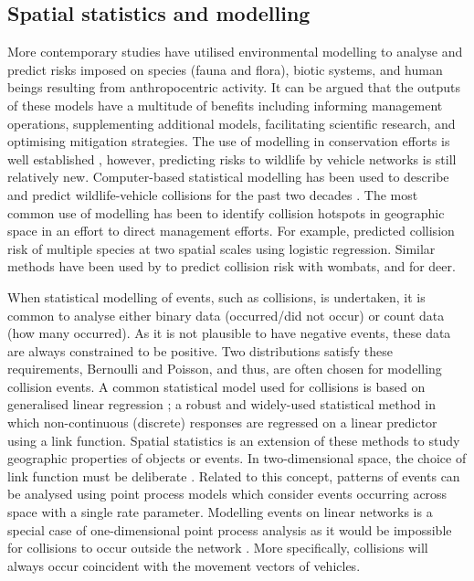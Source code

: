 \subsection{Spatial statistics and modelling}

More contemporary studies have utilised environmental modelling to analyse and predict risks imposed on species (fauna and flora), biotic systems, and human beings resulting from anthropocentric activity. It can be argued that the outputs of these models have a multitude of benefits including informing management operations, supplementing additional models, facilitating scientific research, and optimising mitigation strategies.  The use of modelling in conservation efforts is well established \citep{star86}, however, predicting risks to wildlife by vehicle networks is still relatively new. Computer-based statistical modelling has been used to describe and predict wildlife-vehicle collisions for the past two decades \citep{guns11}.  The most common use of modelling has been to identify collision hotspots in geographic space in an effort to direct management efforts.  For example, \cite{malo04} predicted collision risk of multiple species at two spatial scales using logistic regression.  Similar methods have been used by \cite{roge09} to predict collision risk with wombats, and \cite{sudh09} for deer.

When statistical modelling of events, such as collisions, is undertaken, it is common to analyse either binary data (occurred/did not occur) or count data (how many occurred).  As it is not plausible to have negative events, these data are always constrained to be positive. Two distributions satisfy these requirements, Bernoulli and Poisson, and thus, are often chosen for modelling collision events. A common statistical model used for collisions is based on generalised linear regression \citep{mccu89}; a robust and widely-used statistical method in which non-continuous (discrete) responses are regressed on a linear predictor using a link function. Spatial statistics is an extension of these methods to study geographic properties of objects or events. In two-dimensional space, the choice of link function must be deliberate \citep{badd10}. Related to this concept, patterns of events can be analysed using point process models which consider events occurring across space with a single rate parameter. Modelling events on linear networks is a special case of one-dimensional point process analysis as it would be impossible for collisions to occur outside the network \citep{okab09}.  More specifically, collisions will always occur coincident with the movement vectors of vehicles.

